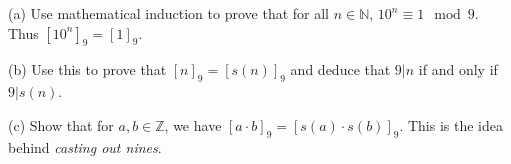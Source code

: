 \documentclass[12pt]{article}
\newcommand{\defn}[1]{{\color{blue}\sl #1}}
\newcommand{\NN}{{\mathbb N}}
\newcommand{\ZZ}{{\mathbb Z}}
\begin{document}
\begin{enumerate}
     (a) Use mathematical induction to prove that for all $n\in\NN$, $10^n\equiv 1\mod 9$.
     Thus $[10^n]_9=[1]_9$.

     (b) Use this to prove that $[n]_9 = [s(n)]_9$ and deduce that $9|n$ if and only if $9|s(n)$.

     (c) Show that for $a,b\in\ZZ$, we have $[a\cdot b]_9=[s(a)\cdot s(b)]_9$.
         This is the idea behind \defn{casting out nines}.



\end{enumerate}
\end{document}
